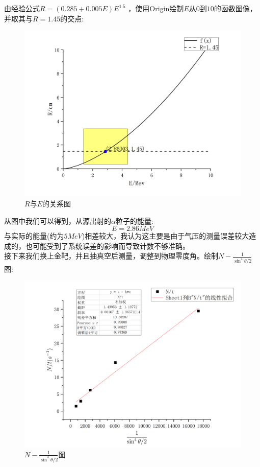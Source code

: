 \documentclass[utf8]{ctexart}
\begin{document}
由经验公式$R = (0.285 + 0.005E)E^{1.5}$ ，使用Origin绘制$E$从$0$到$10$的函数图像，并取其与$R=1.45$的交点:
\begin{figure}[htbp]
	\centering
	\includegraphics[scale=0.4]{Graph2.png}
	\caption{$R$与$E$的关系图}
\end{figure}
从图中我们可以得到，从源出射的$\alpha$粒子的能量:
\begin{equation}
	E = 2.86 MeV
\end{equation}
与实际的能量(约为$5MeV$)相差较大，我认为这主要是由于气压的测量误差较大造成的，也可能受到了系统误差的影响而导致计数不够准确。
\\
接下来我们换上金靶，并且抽真空后测量，调整到物理零度角。绘制$N-\frac{1}{\sin^4{\theta/2}}$图:
\begin{figure}[!htbp]
	\centering
	\includegraphics[scale=0.35]{Graph3.png}
	\caption{$N-\frac{1}{\sin^4{\theta/2}}$图}
\end{figure}
\end{document}
